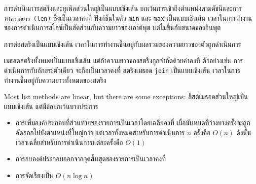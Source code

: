 การดำเนินการสตริงและทูเพิลส่วนใหญ่เป็นแบบเชิงเส้น ยกเว้นการเข้าถึงตำแหน่งตามดัชนีและการหา{\tt ความยาว (len)} ซึ่งเป็นเวลาคงที่ 
ฟังก์ชันในตัว {\tt min} และ {\tt max} เป็นแบบเชิงเส้น เวลาในการทำงานของการดำเนินการสไลซ์เป็นสัดส่วนกับความยาวของเอาต์พุต แต่ไม่ขึ้นกับขนาดของอินพุต

การต่อสตริงเป็นแบบเชิงเส้น เวลาในการทำงานขึ้นอยู่กับผลรวมของความยาวของตัวถูกดำเนินการ


เมธอดสตริงทั้งหมดเป็นแบบเชิงเส้น แต่ถ้าความยาวของสตริงถูกจำกัดด้วยค่าคงที่ ตัวอย่างเช่น 
การดำเนินการกับอักขระตัวเดียว จะถือเป็นเวลาคงที่ สตริงเมธอด {\tt join} เป็นแบบเชิงเส้น 
เวลาในการทำงานขึ้นอยู่กับความยาวทั้งหมดของสตริง

Most list methods are linear, but there are some exceptions:
ลิสต์เมธอดส่วนใหญ่เป็นแบบเชิงเส้น แต่มีข้อยกเว้นบางประการ

\begin{itemize}


\item การเพิ่มองค์ประกอบที่ส่วนท้ายของรายการเป็นเวลาโดยเฉลี่ยคงที่ เมื่อมันหมดที่ว่างบางครั้งจะถูกคัดลอกไปยังตำแหน่งที่ใหญ่กว่า 
แต่เวลาทั้งหมดสำหรับการดำเนินการ $n$ ครั้งคือ $O(n)$ ดังนั้นเวลาเฉลี่ยสำหรับการดำเนินการแต่ละครั้งคือ $O(1)$

\item การลบองค์ประกอบออกจากจุดสิ้นสุดของรายการเป็นเวลาคงที่

\item การจัดเรียงเป็น $O(n \log n)$

\end{itemize}

